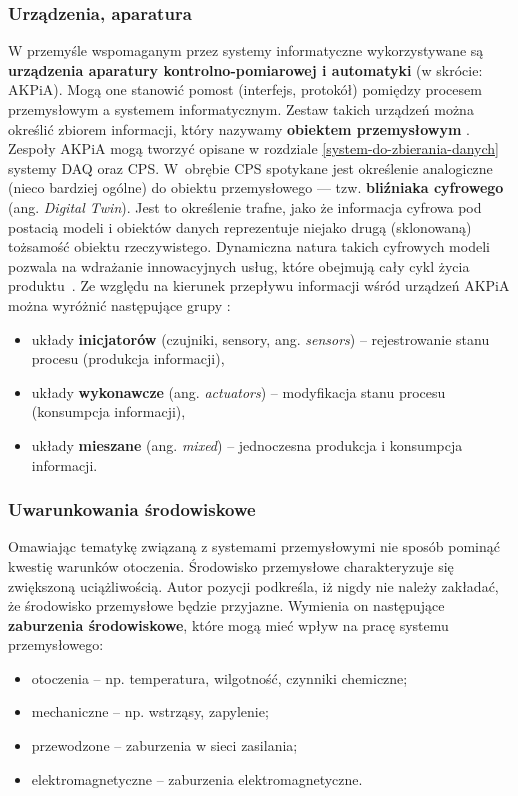 \documentclass[a4paper, 12pt, twoside]{article}
\begin{document}
\subsubsection*{Urządzenia, aparatura} 

W przemyśle wspomaganym przez systemy informatyczne wykorzystywane są 
\textbf{urządzenia aparatury kontrolno-pomiarowej i automatyki} (w skrócie: AKPiA). 
Mogą one stanowić pomost (interfejs, protokół) pomiędzy procesem przemysłowym a systemem informatycznym. 
Zestaw takich urządzeń można określić zbiorem informacji, który nazywamy
\textbf{obiektem przemysłowym} \cite{isp}. Zespoły AKPiA mogą tworzyć opisane
w rozdziale \ref{system-do-zbierania-danych} systemy DAQ oraz CPS. W~obrębie
CPS spotykane jest określenie analogiczne (nieco bardziej ogólne) do obiektu przemysłowego --- 
tzw. \textbf{bliźniaka cyfrowego} (ang. \emph{Digital Twin}). 
Jest to określenie trafne, jako że informacja cyfrowa pod postacią modeli i obiektów
danych reprezentuje niejako drugą (sklonowaną) tożsamość obiektu rzeczywistego.
Dynamiczna natura takich cyfrowych modeli pozwala na wdrażanie innowacyjnych usług,
które obejmują cały cykl życia produktu~\cite{iiot-challenges-opportunities-directions}. 
Ze względu na kierunek przepływu
informacji wśród urządzeń AKPiA można wyróżnić następujące grupy \cite{isp}:
\begin{itemize}
    \itemsep0em 
    \item układy \textbf{inicjatorów} (czujniki, sensory, ang. \emph{sensors}) -- rejestrowanie stanu procesu (produkcja informacji),
    \item układy \textbf{wykonawcze} (ang. \emph{actuators}) -- modyfikacja stanu procesu (konsumpcja informacji),
    \item układy \textbf{mieszane} (ang. \emph{mixed}) -- jednoczesna produkcja i konsumpcja informacji.
\end{itemize}

\subsubsection*{Uwarunkowania środowiskowe} 

Omawiając tematykę związaną z systemami przemysłowymi nie sposób pominąć kwestię
warunków otoczenia. Środowisko przemysłowe charakteryzuje się zwiększoną uciążliwością.
Autor pozycji \cite{isp} podkreśla, iż nigdy nie należy zakładać, że środowisko przemysłowe
będzie przyjazne. Wymienia on następujące \textbf{zaburzenia środowiskowe}, które mogą mieć wpływ na pracę
systemu przemysłowego:
\begin{itemize}
    \itemsep0em 
    \item otoczenia -- np. temperatura, wilgotność, czynniki chemiczne;
    \item mechaniczne -- np. wstrząsy, zapylenie;
    \item przewodzone -- zaburzenia w sieci zasilania;
    \item elektromagnetyczne -- zaburzenia elektromagnetyczne.
\end{itemize}
\end{document}
